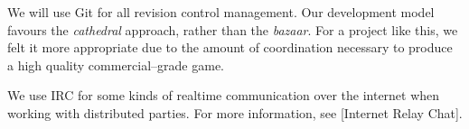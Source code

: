 

\startitemize[4]

We will use Git for all revision control management. Our development model favours the {\it cathedral} approach, rather than the {\it bazaar}. For a project like this, we felt it more appropriate due to the amount of coordination necessary to produce a high quality commercial--grade game.


We use IRC for some kinds of realtime communication over the internet when working with distributed parties. For more information, see [Internet Relay Chat].
\stopitemize

